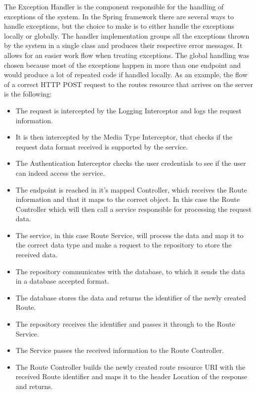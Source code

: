 The Exception Handler is the component responsible for the handling of exceptions of the system. In the Spring framework there 
are several ways to handle exceptions, but the choice to make is to either handle the exceptions locally or globally. The 
handler implementation groups all the exceptions thrown by the system in a single class and produces their respective error 
messages. It allows for an easier work flow when treating exceptions. The global handling was chosen because most of the 
exceptions happen in more than one endpoint and would produce a lot of repeated code if handled locally.      
\newpage
As an example, the flow of a correct HTTP POST request to the routes resource that arrives on the server is the following:
    \begin{itemize}
        \item The request is intercepted by the Logging Interceptor and logs the request information.
        \item It is then intercepted by the Media Type Interceptor, that checks if the request data format 
        received is supported by the service.
        \item The Authentication Interceptor checks the user credentials to see if the user can indeed access the service.
        \item The endpoint is reached in it's mapped Controller, which receives the Route information and that it 
        maps to the correct object. In this case the Route Controller which will then call a service responsible 
        for processing the request data.
        \item The service, in this case Route Service, will process the data and map it  to the correct data type 
        and make a request to the repository to store the received data.
        \item The repository communicates with the database, to which it sends the data in a database accepted format.
        \item The database stores the data and returns the identifier of the newly created Route.
        \item The repository receives the identifier and passes it through to the Route Service.
        \item The Service passes the received information to the Route Controller.
        \item The Route Controller builds the newly created route resource URI with the received Route identifier 
        and maps it to the header Location of the response and returns.
    \end{itemize}
    \newpage

